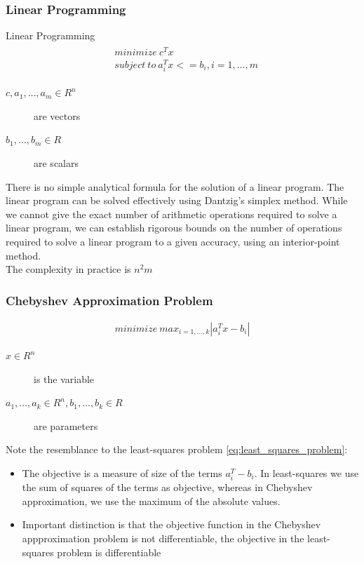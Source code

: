 \documentclass{beamer}
\begin{document}

\begin{frame}
\frametitle{Linear Programming}
\begin{block}{Linear Programming}
\begin{align}
\begin{split}
&minimize~c^{T}x \\
&subject~to~a_{i}^{T}x <= b_{i}, i = 1,\dots,m
\end{split}
\end{align}
\end{block}
\begin{description}
\item [$c,a_{1},\dots,a_{m} \in R^{n}$] are vectors
\item [$b_{1},\dots,b_{m} \in R$] are scalars
\end{description}
There is no simple analytical formula for the solution of a linear program.
The linear program can be solved effectively using Dantzig's simplex method. While we cannot give the exact number of arithmetic operations required to solve a linear program, we can establish rigorous bounds on the number of operations required to solve a linear program to a given accuracy, using an interior-point method. \\
The complexity in practice is $n^{2}m$
\end{frame}


\begin{frame}
\frametitle{Chebyshev Approximation Problem}
\begin{align}
minimize~max_{i=1,\dots,k} |a_{i}^{T}x - b_{i}|
\end{align}
\begin{description}
\item [$x \in R^{n}$] is the variable
\item [$a_{1},\dots,a_{k} \in R^{n}, b_{1},\dots,b_{k} \in R$] are parameters 
\end{description}
Note the resemblance to the least-squares problem \ref{eq:least_squares_problem}:
\begin{itemize}
\item The objective is a measure of size of the terms $a_i^T - b_i$. In least-squares we use the sum of squares of the terms as objective, whereas in Chebyshev approximation, we use the maximum of the absolute values.
\item Important distinction is that the objective function in the Chebyshev appproximation problem is not differentiable, the objective in the least-squares problem is differentiable
\end{itemize}
\end{frame}
\end{document}
